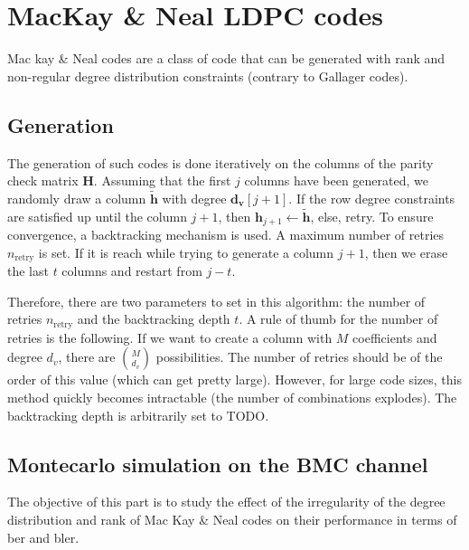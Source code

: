 \section{MacKay \& Neal LDPC codes}
Mac kay \& Neal codes are a class of code that can be generated with rank and
non-regular degree distribution constraints (contrary to Gallager codes).

\subsection{Generation}
The generation of such codes is done iteratively on the columns of the parity
check matrix $\bm{H}$. Assuming that the first $j$ columns have been generated,
we randomly draw a column $\bm{\tilde{h}}$ with degree $\bm{d_v}[j+1]$. If the
row degree constraints are satisfied up until the column $j+1$, then
$\bm{h}_{j+1} \leftarrow \bm{\tilde{h}}$, else, retry. To ensure convergence, a
backtracking mechanism is used. A maximum number of retries $n_\text{retry}$ is
set. If it is reach while trying to generate a column $j + 1$, then we erase the
last $t$ columns and restart from $j - t$.

Therefore, there are two parameters to set in this algorithm: the number of
retries $n_\text{retry}$ and the backtracking depth $t$. A rule of thumb for the
number of retries is the following. If we want to create a column with $M$
coefficients and degree $d_v$, there are $\binom{M}{d_v}$ possibilities. The
number of retries should be of the order of this value (which can get pretty
large). However, for large code sizes, this method quickly becomes intractable
(the number of combinations explodes). The backtracking depth is arbitrarily set
to TODO.

\subsection{Montecarlo simulation on the BMC channel}

The objective of this part is to study the effect of the irregularity of the
degree distribution and rank of Mac Kay \& Neal codes on their performance in
terms of \acrshort{ber} and \acrshort{bler}.

